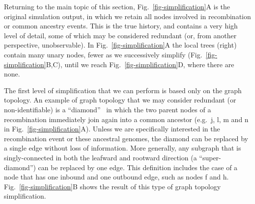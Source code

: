 \documentclass[9pt,twocolumn,twoside]{gsajnl}
\newcommand{\noderef}[1]{\textsf{#1}}
\begin{document}
Returning to the main topic of this section,
Fig.~\ref{fig-simplification}A is the original simulation output, in
which we retain all nodes involved in recombination
or common ancestry events. This is the true history, and contains
a very high level of detail, some of which may be considered
redundant (or, from another perspective, unobservable).
In Fig.~\ref{fig-simplification}A the local trees (right)
contain many unary nodes, fewer as  we successively
simplify (Fig.~\ref{fig-simplification}B,C),
until we reach Fig.~\ref{fig-simplification}D, where there are none.

The first level of simplification that we can perform is based only
on the graph topology.
An example of graph topology that we may consider redundant
(or non-identifiable) is a
``diamond''~\citep{rasmussen2014genome}
in which the two parent nodes of a recombination immediately
join again into a common ancestor (e.g.~\noderef{j}, \noderef{l}, \noderef{m}
and \noderef{n} in Fig.~\ref{fig-simplification}A).
Unless we are specifically
interested in the recombination event or these ancestral genomes,
the diamond can be replaced by a single edge without loss of
information.
More generally, any subgraph that is singly-connected in both the leafward and
rootward direction (a ``super-diamond'') can be replaced by one edge.
This definition includes the case
of a node that has one inbound and one outbound edge, such as
nodes \noderef{f} and \noderef{h}.
Fig.~\ref{fig-simplification}B shows the result of this type of
graph topology simplification.
\end{document}
